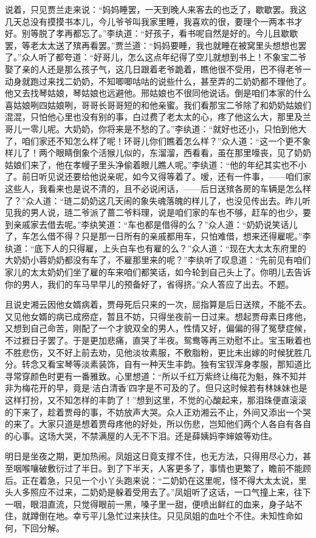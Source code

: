 \begin{parag}
    说着，只见贾兰走来说：“妈妈睡罢，一天到晚人来客去的也乏了，歇歇罢。我这几天总没有摸摸书本儿，今儿爷爷叫我家里睡，我喜欢的很，要理个一两本书才好。别等脱了孝再都忘了。”李纨道：“好孩子，看书呢自然是好的。今儿且歇歇罢，等老太太送了殡再看罢。”贾兰道：“妈妈要睡，我也就睡在被窝里头想想也罢了。”众人听了都夸道：“好哥儿，怎么这点年纪得了空儿就想到书上！不象宝二爷娶了亲的人还是那么孩子气，这几日跟着老爷跪着，瞧他很不受用，巴不得老爷一动身就跑过来找二奶奶，不知唧唧咕咕的说些什么，甚至弄的二奶奶都不理他了。他又去找琴姑娘，琴姑娘也远避他。邢姑娘也不很同他说话。倒是咱们本家的什么喜姑娘咧四姑娘咧，哥哥长哥哥短的和他亲蜜。我们看那宝二爷除了和奶奶姑娘们混混，只怕他心里也没有别的事，白过费了老太太的心，疼了他这么大，那里及兰哥儿一零儿呢。大奶奶，你将来是不愁的了。”李纨道：“就好也还小，只怕到他大了，咱们家还不知怎么样了呢！环哥儿你们瞧着怎么样？”众人道：“这一个更不象样儿了！两个眼睛倒象个活猴儿似的，东溜溜，西看看，虽在那里嚎丧，见了奶奶姑娘们来了，他在孝幔子里头净偷着眼儿瞧人呢。”李纨道：“他的年纪其实也不小了。前日听见说还要给他说亲呢，如今又得等着了。嗳，还有一件事，——咱们家这些人，我看来也是说不清的，且不必说闲话，——后日送殡各房的车辆是怎么样了？”众人道：“琏二奶奶这几天闹的象失魂落魄的样儿了，也没见传出去。昨儿听见我的男人说，琏二爷派了蔷二爷料理，说是咱们家的车也不够，赶车的也少，要到亲戚家去借去呢。”李纨笑道：“车也都是借得的么？”众人道：“奶奶说笑话儿了，车怎么借不得？只是那一日所有的亲戚都用车，只怕难借，想来还得雇呢。”李纨道：“底下人的只得雇，上头白车也有雇的么？”众人道：“现在大太太东府里的大奶奶小蓉奶奶都没有车了，不雇那里来的呢？”李纨听了叹息道：“先前见有咱们家儿的太太奶奶们坐了雇的车来咱们都笑话，如今轮到自己头上了。你明儿去告诉你的男人，我们的车马早早儿的预备好了，省得挤。”众人答应了出去。不题。
\end{parag}


\begin{parag}
    且说史湘云因他女婿病着，贾母死后只来的一次，屈指算是后日送殡，不能不去。又见他女婿的病已成痨症，暂且不妨，只得坐夜前一日过来。想起贾母素日疼他，又想到自己命苦，刚配了一个才貌双全的男人，性情又好，偏偏的得了冤孽症候，不过捱日子罢了。于是更加悲痛，直哭了半夜。鸳鸯等再三劝慰不止。宝玉瞅着也不胜悲伤，又不好上前去劝，见他淡妆素服，不敷脂粉，更比未出嫁的时候犹胜几分。转念又看宝琴等淡素装饰，自有一种天生丰韵。独有宝钗浑身孝服，那知道比寻常穿颜色时更有一番雅致。心里想道：“所以千红万紫终让梅花为魁，殊不知并非为梅花开的早，竟是‘洁白清香’四字是不可及的了。但只这时候若有林妹妹也是这样打扮，又不知怎样的丰韵了！”想到这里，不觉的心酸起来，那泪珠便直滚滚的下来了，趁着贾母的事，不妨放声大哭。众人正劝湘云不止，外间又添出一个哭的来了。大家只道是想着贾母疼他的好处，所以伤悲，岂知他们两个人各自有各自的心事。这场大哭，不禁满屋的人无不下泪。还是薛姨妈李婶娘等劝住。
\end{parag}


\begin{parag}
    明日是坐夜之期，更加热闹。凤姐这日竟支撑不住，也无方法，只得用尽心力，甚至咽喉嚷破敷衍过了半日。到了下半天，人客更多了，事情也更繁了，瞻前不能顾后。正在着急，只见一个小丫头跑来说：“二奶奶在这里呢，怪不得大太太说，里头人多照应不过来，二奶奶是躲着受用去了。”凤姐听了这话，一口气撞上来，往下一咽，眼泪直流，只觉得眼前一黑，嗓子里一甜，便喷出鲜红的血来，身子站不住，就蹲倒在地。幸亏平儿急忙过来扶住。只见凤姐的血吐个不住。未知性命如何，下回分解。
\end{parag}